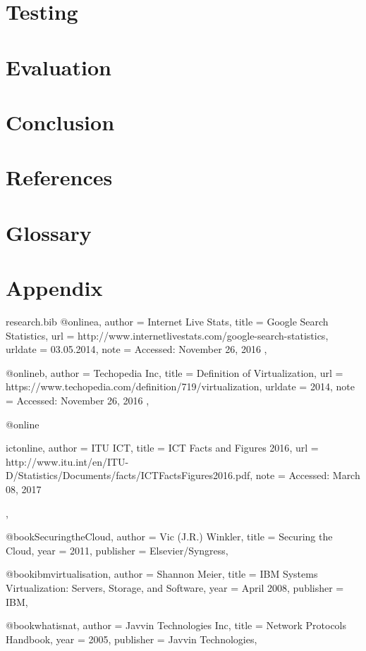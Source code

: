 \documentclass{article}
\begin{document}
  \newpage
  

  \newpage
  \section{Testing}

  \newpage
  \section{Evaluation}

  \newpage
  \section{Conclusion}

  \newpage
  \section{References}
	
	\renewcommand{\bibname}{}
  \section{Glossary}
  	\printglossary
  \newpage
  \section{Appendix}

	

	\begin{filecontents*}{research.bib}
		@online{a,
			author = {Internet Live Stats},
			title = {Google Search Statistics},
			url = {http://www.internetlivestats.com/google-search-statistics},
			urldate = {03.05.2014},
			note = {Accessed: November 26, 2016}
		},
	
		@online{b,
			author = {Techopedia Inc},
			title = {Definition of Virtualization},
			url = {https://www.techopedia.com/definition/719/virtualization},
			urldate = {2014},
			note = {Accessed: November 26, 2016}
		},
	
		@online{ictonline,
			author = {ITU ICT},
			title = {ICT Facts and Figures 2016},
			url = {http://www.itu.int/en/ITU-D/Statistics/Documents/facts/ICTFactsFigures2016.pdf},
			note = {Accessed: March 08, 2017}

		},
	
		@book{SecuringtheCloud,
			author    = {Vic (J.R.) Winkler},
			title     = {Securing the Cloud},
			year      = {2011},
			publisher = {Elsevier/Syngress},
		}
	
		@book{ibmvirtualisation,
			author    = {Shannon Meier},
			title     = {IBM Systems Virtualization: Servers, Storage, and Software},
			year      = {April 2008},
			publisher = {IBM},
		}
	
	    @book{whatisnat,
			author    = {Javvin Technologies Inc},
			title     = {Network Protocols Handbook},
			year      = {2005},
			publisher = {Javvin Technologies},
		}

		
	\end{filecontents*}

	
\end{document}
